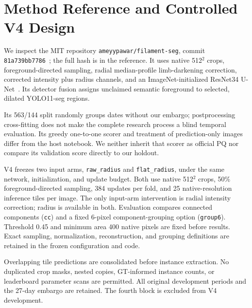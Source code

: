\documentclass[sigconf]{acmart}
\begin{document}
\section{Method Reference and Controlled V4 Design}
We inspect the MIT repository \texttt{ameyypawar/filament-seg}, commit \texttt{81a739bb7786}~\cite{pawar}; the full hash is in the reference. It uses native 512$^2$ crops, foreground-directed sampling, radial median-profile limb-darkening correction, corrected intensity plus radius channels, and an ImageNet-initialized ResNet34 U-Net~\cite{resnet}. Its detector fusion assigns unclaimed semantic foreground to selected, dilated YOLO11-seg regions.

Its 563/144 split randomly groups dates without our embargo; postprocessing cross-fitting does not make the complete research process a blind temporal evaluation. Its greedy one-to-one scorer and treatment of prediction-only images differ from the host notebook. We neither inherit that scorer as official PQ nor compare its validation score directly to our holdout.

V4 freezes two input arms, \texttt{raw\_radius} and \texttt{flat\_radius}, under the same network, initialization, and update budget. Both use native 512$^2$ crops, 50\% foreground-directed sampling, 384 updates per fold, and 25 native-resolution inference tiles per image. The only input-arm intervention is radial intensity correction; radius is available in both. Evaluation compares connected components (\texttt{cc}) and a fixed 6-pixel component-grouping option (\texttt{group6}). Threshold 0.45 and minimum area 400 native pixels are fixed before results. Exact sampling, normalization, reconstruction, and grouping definitions are retained in the frozen configuration and code.

Overlapping tile predictions are consolidated before instance extraction. No duplicated crop masks, nested copies, GT-informed instance counts, or leaderboard parameter scans are permitted. All original development periods and the 27-day embargo are retained. The fourth block is excluded from V4 development.

\clearpage
\end{document}
